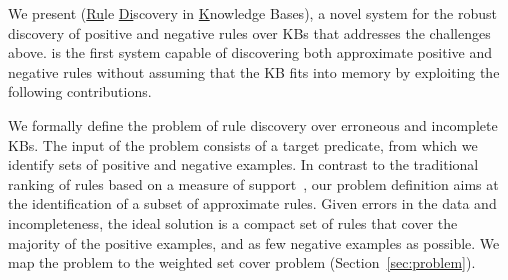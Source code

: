 We present \krd (\underline{Ru}le \underline{Di}scovery in \underline{K}nowledge Bases), a novel system for the robust discovery of positive and negative rules %
over KBs that addresses the challenges above.  
\krd is the first system capable of discovering both approximate positive and negative rules without
assuming that the KB fits into memory by exploiting the following contributions.

We formally define the problem of rule discovery over erroneous and incomplete KBs. The input of the problem consists of a target predicate, from which we identify sets of positive and negative examples.  In contrast to the traditional ranking of rules based on a measure of support~\cite{dehaspe1999discovery,galarraga2015fast,schoenmackers2010learning}, our  problem definition aims at the identification of a subset of approximate rules. %
Given errors in the data and incompleteness, the ideal solution is a compact set of rules that cover the majority of the positive examples, and as few negative examples as possible. We map the problem to the %
weighted set cover problem (Section~\ref{sec:problem}).




